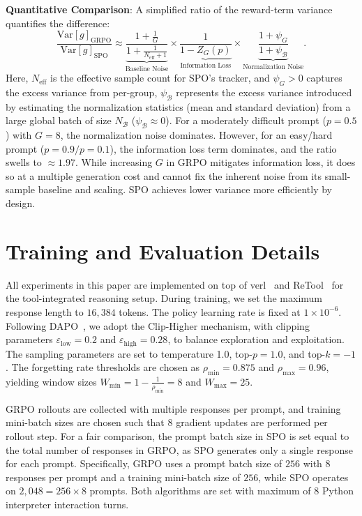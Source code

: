 \textbf{Quantitative Comparison}: A simplified ratio of the reward-term variance quantifies the difference:
\begin{equation}
\frac{\text{Var}[g]_{\text{GRPO}}}{\text{Var}[g]_{\text{SPO}}} \approx \underbrace{\frac{1 + \frac{1}{G}}{1 + \frac{1}{N_{\text{eff}}+1}}}_{\text{Baseline Noise}} \times \underbrace{\frac{1}{1 - Z_G(p)}}_{\text{Information Loss}} \times \underbrace{\frac{1 + \psi_G}{1 + \psi_{\mathcal{B}}}}_{\text{Normalization Noise}}.
\end{equation}
Here, $N_{\text{eff}}$ is the effective sample count for SPO's tracker, and $\psi_G > 0$ captures the excess variance from per-group, $\psi_\mathcal{B}$ represents the excess variance introduced by estimating the normalization statistics (mean and standard deviation) from a large global batch of size $N_\mathcal{B}$ ($\psi_\mathcal{B} \approx 0$). For a moderately difficult prompt ($p=0.5$) with $G=8$, the normalization noise dominates. However, for an easy/hard prompt ($p=0.9 / p=0.1$), the information loss term dominates, and the ratio swells to $\approx 1.97$. While increasing $G$ in GRPO mitigates information loss, it does so at a multiple generation cost and cannot fix the inherent noise from its small-sample baseline and scaling. SPO achieves lower variance more efficiently by design.




\section{Training and Evaluation Details}
\label{appendix:training_details}
All experiments in this paper are implemented on top of verl~\cite{verl} and ReTool~\cite{feng2025retool} for the tool-integrated reasoning setup.
During training, we set the maximum response length to $16{,}384$ tokens. 
The policy learning rate is fixed at $1\times 10^{-6}$. 
Following DAPO~\cite{DAPO}, we adopt the Clip-Higher mechanism, with clipping parameters $\varepsilon_\text{low}=0.2$ and $\varepsilon_\text{high}=0.28$, to balance exploration and exploitation. 
The sampling parameters are set to temperature 1.0, top-$p =1.0$, and top-$k=-1$.
The forgetting rate thresholds are chosen as $\rho_{\min} = 0.875$ and $\rho_{\max} = 0.96$, yielding window sizes $W_{\min} = 1 - \tfrac{1}{\rho_{\min}} = 8$ and $W_{\max} = 25$.

GRPO rollouts are collected with multiple responses per prompt, and training mini-batch sizes are chosen such that $8$ gradient updates are performed per rollout step. 
For a fair comparison, the prompt batch size in SPO is set equal to the total number of responses in GRPO, as SPO generates only a single response for each prompt. Specifically, GRPO uses a prompt batch size of $256$ with $8$ responses per prompt and a training mini-batch size of $256$, while SPO operates on $2,048 = 256 \times 8$ prompts. Both algorithms are set with maximum of $8$ Python interpreter interaction turns.

